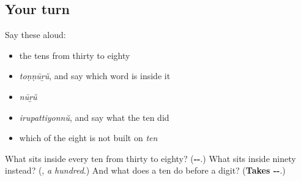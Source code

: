 \subsection*{Your turn}
Say these aloud:

\begin{itemize}
\raggedright
  \item the tens from thirty to eighty
  \item \emph{toṇṇūṟŭ}, and say which word is inside it
  \item \emph{nūṟŭ}
  \item \emph{irupattiyonnŭ}, and say what the ten did
  \item which of the eight is not built on \emph{ten}
\end{itemize}

\begin{tcolorbox}[breakable,colback=teal!4,colframe=teal!35!black,title={Before you move on}]
What sits inside every ten from thirty to eighty? (\textbf{--}.) What sits inside ninety instead? (\textbf{}, \emph{a hundred}.) And what does a ten do before a digit? (\textbf{Takes --}.)
\end{tcolorbox}
